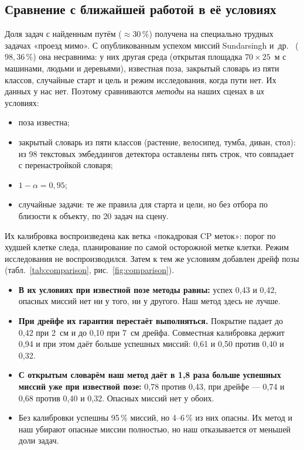 \subsection{Сравнение с ближайшей работой в её условиях}\label{sec:comparison}

Доля задач с найденным путём ($\approx 30\,\%$) получена на специально трудных задачах «проезд мимо». С опубликованным успехом миссий Sundarsingh и~др.~\cite{sundarsingh} ($98{,}36\,\%$) она несравнима: у них другая среда (открытая площадка $70\times25$~м с машинами, людьми и деревьями), известная поза, закрытый словарь из пяти классов, случайные старт и цель и режим исследования, когда пути нет. Их данных у нас нет. Поэтому сравниваются \emph{методы} на наших сценах в \emph{их} условиях:
\begin{itemize}[nosep]
  \item поза известна;
  \item закрытый словарь из пяти классов (растение, велосипед, тумба, диван, стол): из 98 текстовых эмбеддингов детектора оставлены пять строк, что совпадает с перенастройкой словаря;
  \item $1-\alpha = 0{,}95$;
  \item случайные задачи: те же правила для старта и цели, но без отбора по близости к объекту, по 20 задач на сцену.
\end{itemize}
Их калибровка воспроизведена как ветка «покадровая CP меток»: порог по худшей клетке следа, планирование по самой осторожной метке клетки. Режим исследования не воспроизводился. Затем к тем же условиям добавлен дрейф позы (табл.~\ref{tab:comparison}, рис.~\ref{fig:comparison}).

\begin{table}[H]
\centering\scriptsize\setlength{\tabcolsep}{3.5pt}
\caption{Случайные задачи: покрытие (минимум по растению и велосипеду), доля успешных миссий (безопасный путь до цели) и доля опасных миссий (путь ближе 0{,}5~м к запретному объекту)}
\label{tab:comparison}

\end{table}


\begin{itemize}[nosep]
  \item \textbf{В их условиях при известной позе методы равны:} успех 0{,}43 и 0{,}42, опасных миссий нет ни у того, ни у другого. Наш метод здесь не лучше.
  \item \textbf{При дрейфе их гарантия перестаёт выполняться.} Покрытие падает до 0{,}42 при 2~см и до 0{,}10 при 7~см дрейфа. Совместная калибровка держит 0{,}94 и при этом даёт больше успешных миссий: 0{,}61 и 0{,}50 против 0{,}40 и 0{,}32.
  \item \textbf{С открытым словарём наш метод даёт в 1{,}8 раза больше успешных миссий уже при известной позе:} 0{,}78 против 0{,}43, при дрейфе --- 0{,}74 и 0{,}68 против 0{,}40 и 0{,}32. Опасных миссий нет у обоих.
  \item Без калибровки успешны 95\,\% миссий, но 4--6\,\% из них опасны. Их метод и наш убирают опасные миссии полностью, но наш отказывается от меньшей доли задач.
\end{itemize}


